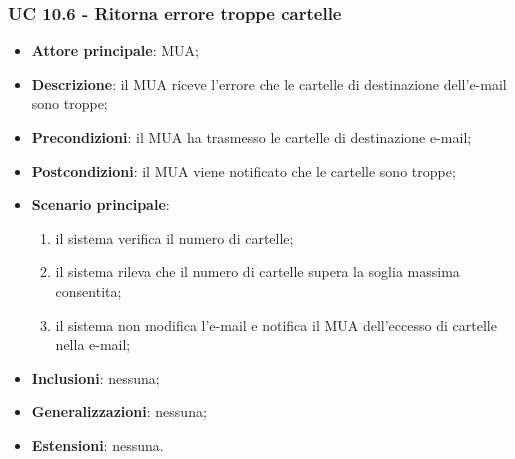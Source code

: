    \subsubsection{UC 10.6 - Ritorna errore troppe cartelle} \label{sec:UC10.6}
    \begin{itemize}
        \item \textbf{Attore principale}: MUA;
        \item \textbf{Descrizione}: il MUA riceve l'errore che le cartelle di destinazione dell'e-mail sono troppe;
        \item \textbf{Precondizioni}: il MUA ha trasmesso le cartelle di destinazione e-mail;
        \item \textbf{Postcondizioni}: il MUA viene notificato che le cartelle sono troppe;
        \item \textbf{Scenario principale}:
            \begin{enumerate}
                \item il sistema verifica il numero di cartelle;
                \item il sistema rileva che il numero di cartelle supera la soglia massima consentita;
                \item il sistema non modifica l'e-mail e notifica il MUA dell'eccesso di cartelle nella e-mail;
            \end{enumerate}
        \item \textbf{Inclusioni}: nessuna;
        \item \textbf{Generalizzazioni}: nessuna;
        \item \textbf{Estensioni}: nessuna.
    \end{itemize}
